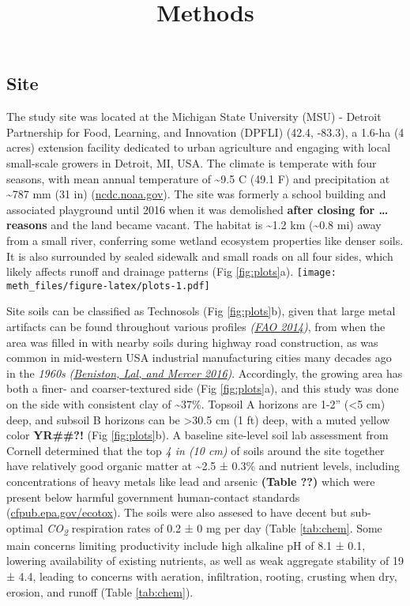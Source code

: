 \documentclass[
]{article}
\title{Methods}
\author{}
\date{\vspace{-2.5em}}
\begin{document}
\maketitle

\hypertarget{site}{%
\subsection{Site}\label{site}}

The study site was located at the Michigan State University (MSU) - Detroit Partnership for Food, Learning, and Innovation (DPFLI) (42.4, -83.3), a 1.6-ha (4 acres) extension facility dedicated to urban agriculture and engaging with local small-scale growers in Detroit, MI, USA.
The climate is temperate with four seasons, with mean annual temperature of \textasciitilde9.5 C (49.1 F) and precipitation at \textasciitilde787 mm (31 in) (\url{ncdc.noaa.gov}).
The site was formerly a school building and associated playground until 2016 when it was demolished \textbf{after closing for \ldots{} reasons} and the land became vacant.
The habitat is \textasciitilde1.2 km (\textasciitilde0.8 mi) away from a small river, conferring some wetland ecosystem properties like denser soils.
It is also surrounded by sealed sidewalk and small roads on all four sides, which likely affects runoff and drainage patterns (Fig \ref{fig:plots}a).
\texttt{[image: meth\_files/figure-latex/plots-1.pdf]}

Site soils can be classified as Technosols (Fig \ref{fig:plots}b), given that large metal artifacts can be found throughout various profiles \emph{(\protect\hyperlink{ref-fao14}{FAO 2014})}, from when the area was filled in with nearby soils during highway road construction, as was common in mid-western USA industrial manufacturing cities many decades ago in the \emph{1960s} \emph{(\protect\hyperlink{ref-beniston16}{Beniston, Lal, and Mercer 2016})}.
Accordingly, the growing area has both a finer- and coarser-textured side (Fig \ref{fig:plots}a),
and this study was done on the side with consistent clay of \textasciitilde37\%.
Topsoil A horizons are 1-2'' (\textless5 cm) deep, and subsoil B horizons can be \textgreater30.5 cm (1 ft) deep, with a muted yellow color \textbf{YR\#\#?!} (Fig \ref{fig:plots}b).
A baseline site-level soil lab assessment from Cornell determined that the top \emph{4 in (10 cm)} of soils around the site together have relatively good organic matter at
\textasciitilde2.5 ±
0.3\%
and nutrient levels, including concentrations of heavy metals like lead and arsenic \textbf{(Table ??)} which were present below harmful government human-contact standards (\url{cfpub.epa.gov/ecotox}).
The soils were also assesed to have decent but sub-optimal \emph{CO\textsubscript{2}} respiration rates of
0.2 ±
0 mg per day
(Table \ref{tab:chem}.
Some main concerns limiting productivity include high alkaline pH of
8.1 ±
0.1,
lowering availability of existing nutrients, as well as weak aggregate stability of
19 ±
4.4,
leading to concerns with aeration, infiltration, rooting, crusting when dry, erosion, and runoff (Table \ref{tab:chem}).
\end{document}

